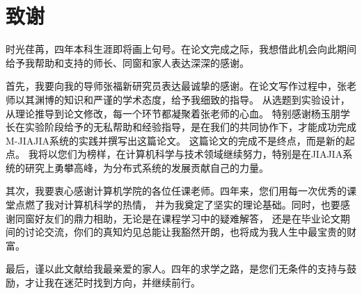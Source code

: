 \chapter[致谢]{致\quad 谢}%

时光荏苒，四年本科生涯即将画上句号。在论文完成之际，我想借此机会向此期间给予我帮助和支持的师长、同窗和家人表达深深的感谢。

首先，我要向我的导师张福新研究员表达最诚挚的感谢。在论文写作过程中，张老师以其渊博的知识和严谨的学术态度，给予我细致的指导。
从选题到实验设计，从理论推导到论文修改，每一个环节都凝聚着张老师的心血。
特别感谢杨玉朋学长在实验阶段给予的无私帮助和经验指导，是在我们的共同协作下，才能成功完成M-JIAJIA系统的实践并撰写出这篇论文。
这篇论文的完成不是终点，而是新的起点。
我将以您们为榜样，在计算机科学与技术领域继续努力，特别是在JIAJIA系统的研究上勇攀高峰，为分布式系统的发展贡献自己的力量。

其次，我要衷心感谢计算机学院的各位任课老师。四年来，您们用每一次优秀的课堂点燃了我对计算机科学的热情，
并为我奠定了坚实的理论基础。同时，也要感谢同窗好友们的鼎力相助，无论是在课程学习中的疑难解答，
还是在毕业论文期间的讨论交流，你们的真知灼见总能让我豁然开朗，也将成为我人生中最宝贵的财富。

最后，谨以此文献给我最亲爱的家人。四年的求学之路，是您们无条件的支持与鼓励，才让我在迷茫时找到方向，并继续前行。






